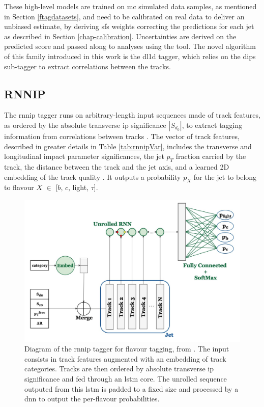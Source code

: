 These high-level models are trained on \gls{mc} simulated data samples, as mentioned in Section \ref{ftagdatasets}, and need to be calibrated on real data to deliver an unbiased estimate, by deriving \glspl{sf} weights correcting the predictions for each jet as described in Section \ref{chap-calibration}. Uncertainties are derived on the predicted score and passed along to analyses using the tool. The novel algorithm of this family introduced in this work is the \gls{dl1d} tagger, which relies on the \gls{dips} sub-tagger to extract correlations between the tracks.  

\subsection{RNNIP}
The \gls{rnnip} tagger runs on arbitrary-length input sequences made of track features, as ordered by the absolute transverse \gls{ip} significance $|S_{d_0}|$, to extract tagging information from correlations between tracks \cite{ATL-PHYS-PUB-2017-003}. The vector of track features, described in greater details in Table \ref{tab:rnnipVar}, includes the transverse and longitudinal impact parameter significances, the jet $p_T$ fraction carried by the track, the distance between the track and the jet axis, and a learned 2D embedding of the track quality \cite{Paganini:2289214}. It outputs a probability $p_X$ for the jet to belong to flavour $X$ $\in$ [$b$, $c$, light, $\tau$].

\begin{figure}[h!]
  \center
  \includegraphics[scale=0.6]{Images/FTAG/rnnip_structure.png}
  \caption{Diagram of the \gls{rnnip} tagger for flavour tagging, from \cite{Paganini:2289214}. The input consists in track features augmented with an embedding of track categories. Tracks are then ordered by absolute transverse \gls{ip} significance and fed through an \gls{lstm} core. The unrolled sequence outputed from this \gls{lstm} is padded to a fixed size and processed by a \gls{dnn} to output the per-flavour probabilities.} 
  \label{fig:rnnipModel}
\end{figure}

